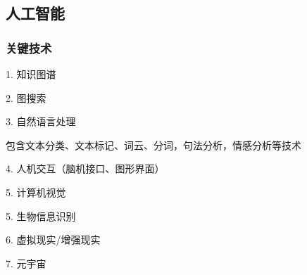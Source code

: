 \subsection{人工智能}%
\label{sub:人工智能}
\subsubsection*{关键技术}%
\label{subsub*:关键技术}
1. 知识图谱

2. 图搜索

3. 自然语言处理
\begin{notation}
    包含文本分类、文本标记、词云、分词，句法分析，情感分析等技术
\end{notation}
4. 人机交互（脑机接口、图形界面）

5. 计算机视觉

5. 生物信息识别

6. 虚拟现实/增强现实

7. 元宇宙
